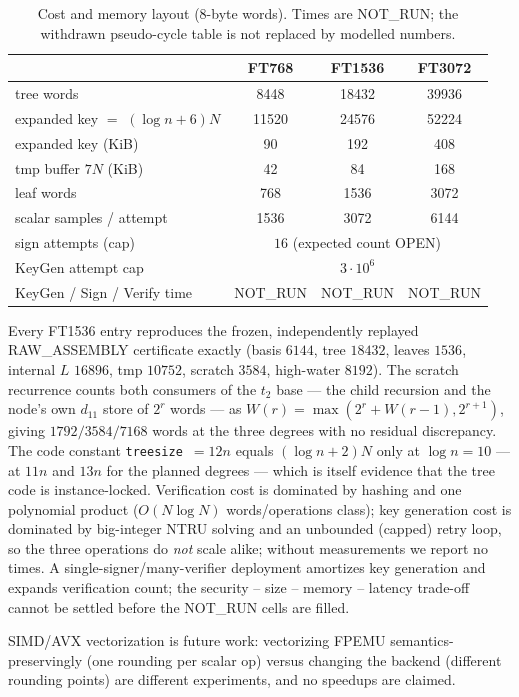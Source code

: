 \documentclass[11pt,a4paper]{article}
\theoremstyle{remark}
\newcommand{\NOTRUN}{\textsf{NOT\_RUN}}
\newcommand{\OPEN}{\textsf{OPEN}}
\begin{document}
\begin{table}[ht]\centering
\caption{Cost and memory layout (8-byte words). Times are \NOTRUN; the
withdrawn pseudo-cycle table is not replaced by modelled numbers.}
\label{tab:cost}
\begin{tabular}{lccc}
\toprule
 & FT768 & FT1536 & FT3072 \\
\midrule
tree words & 8448 & 18432 & 39936 \\
expanded key $=$ $(\log n{+}6)N$ & 11520 & 24576 & 52224 \\
expanded key (KiB) & 90 & 192 & 408 \\
tmp buffer $7N$ (KiB) & 42 & 84 & 168 \\
leaf words & 768 & 1536 & 3072 \\
scalar samples / attempt & 1536 & 3072 & 6144 \\
sign attempts (cap) & \multicolumn{3}{c}{$16$ (expected count \OPEN)} \\
KeyGen attempt cap & \multicolumn{3}{c}{$3\cdot10^{6}$} \\
KeyGen / Sign / Verify time & \NOTRUN & \NOTRUN & \NOTRUN \\
\bottomrule
\end{tabular}
\end{table}

Every FT1536 entry reproduces the frozen, independently replayed
RAW\_ASSEMBLY certificate exactly (basis $6144$, tree $18432$, leaves $1536$,
internal $L$ $16896$, tmp $10752$, scratch $3584$, high-water $8192$). The
scratch recurrence counts both consumers of the $t_2$ base --- the child
recursion and the node's own $d_11$ store of $2^r$ words --- as
$W(r)=\max(2^r+W(r-1),2^{r+1})$, giving $1792/3584/7168$ words at the three
degrees with no residual discrepancy. The code constant \texttt{treesize
$=12n$} equals $(\log n+2)N$ only at $\log n=10$ --- at $11n$ and $13n$ for
the planned degrees --- which is itself evidence that the tree code is
instance-locked. Verification cost is dominated by hashing and one
polynomial product ($O(N\log N)$ words/operations class); key generation
cost is dominated by big-integer NTRU solving and an unbounded (capped)
retry loop, so the three operations do \emph{not} scale alike; without
measurements we report no times. A single-signer/many-verifier deployment
amortizes key generation and expands verification count; the security --
size -- memory -- latency trade-off cannot be settled before the \NOTRUN{}
cells are filled.

SIMD/AVX vectorization is future work: vectorizing FPEMU semantics-preservingly
(one rounding per scalar op) versus changing the backend (different rounding
points) are different experiments, and no speedups are claimed.
\end{document}
